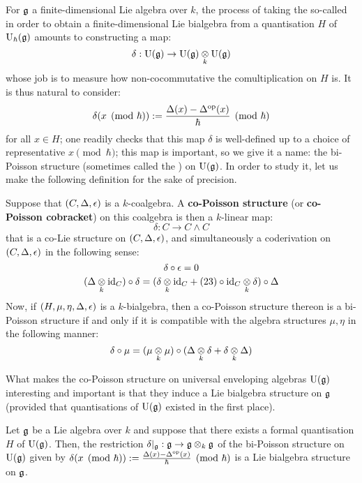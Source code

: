         For $\mathfrak{g}$ a finite-dimensional Lie algebra over $k$, the process of taking the so-called  in order to obtain a finite-dimensional Lie bialgebra from a quantisation $H$ of $\mathrm{U}_{\hbar}(\mathfrak{g})$ amounts to constructing a  map:
            $$\delta: \rmU(\g) \to \rmU(\g) \tensor_k \rmU(\g)$$
        whose job is to measure how non-cocommutative the comultiplication on $H$ is. It is thus natural to consider:
            $$\delta(x \pmod{\hbar}) := \frac{\Delta(x) - \Delta^{\mathrm{op}}(x)}{\hbar} \pmod{\hbar}$$
        for all $x \in H$; one readily checks that this map $\delta$ is well-defined up to a choice of representative $x \pmod{\hbar}$; this map is important, so we give it a name: the bi-Poisson structure (sometimes called the ) on $\mathrm{U}(\mathfrak{g})$. In order to study it, let us make the following definition for the sake of precision.
        \begin{definition} \label{def: co/bi_poisson_structures}
            Suppose that $(C, \Delta, \epsilon)$ is a $k$-coalgebra. A \textbf{co-Poisson structure} (or \textbf{co-Poisson cobracket}) on this coalgebra is then a $k$-linear map:
                $$\delta: C \to C \wedge C$$
            that is a co-Lie structure on $(C, \Delta, \epsilon)$, and simultaneously a coderivation on $(C, \Delta, \epsilon)$ in the following sense:
                $$\delta \circ \epsilon = 0$$
                $$(\Delta \tensor_k \id_C) \circ \delta = (\delta \tensor_k \id_C + (23) \circ \id_C \tensor_k \delta) \circ \Delta$$
            Now, if $(H, \mu, \eta, \Delta, \epsilon)$ is a $k$-bialgebra, then a co-Poisson structure thereon is a bi-Poisson structure if and only if it is compatible with the algebra structures $\mu, \eta$ in the following manner:
                $$\delta \circ \mu = (\mu \tensor_k \mu) \circ (\Delta \tensor_k \delta + \delta \tensor_k \Delta)$$
        \end{definition}
        What makes the co-Poisson structure on universal enveloping algebras $\mathrm{U}(\mathfrak{g})$ interesting and important is that they induce a Lie bialgebra structure on $\mathfrak{g}$ (provided that quantisations of $\mathrm{U}(\mathfrak{g})$ existed in the first place). 
        \begin{theorem} \label{theorem: lie_bialgebra_structures_from_co_poisson_structures}
            Let $\mathfrak{g}$ be a Lie algebra over $k$ and suppose that there exists a formal quantisation $H$ of $\mathrm{U}(\mathfrak{g})$. Then, the restriction $\delta|_{\g}: \g \to \g \tensor_k \g$ of the bi-Poisson structure on $\mathrm{U}(\mathfrak{g})$ given by $\delta(x \pmod{\hbar}) := \frac{\Delta(x) - \Delta^{\mathrm{op}}(x)}{\hbar} \pmod{\hbar}$ is a Lie bialgebra structure on $\mathfrak{g}$.    
        \end{theorem}
